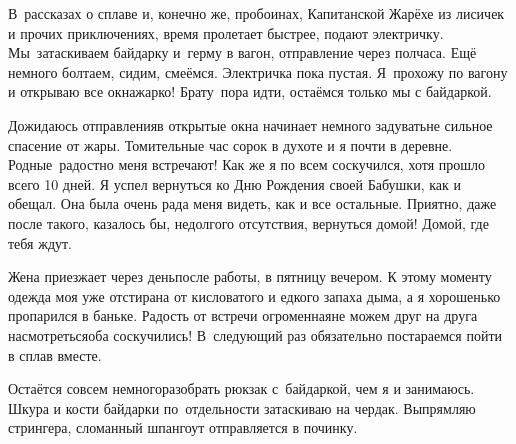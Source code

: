 В~рассказах о сплаве и, конечно же, пробоинах, Капитанской Жарёхе из лисичек и прочих приключениях, время пролетает быстрее, подают электричку. Мы~затаскиваем байдарку и~герму в вагон, отправление через полчаса. Ещё немного болтаем, сидим, смеёмся. Электричка пока пустая. Я~прохожу по вагону и открываю все окна\mdash жарко! Брату~пора идти, остаёмся только мы с байдаркой. 

Дожидаюсь отправления\mdash в открытые окна начинает немного задувать\mdash не сильное спасение от жары. Томительные час сорок в духоте и я почти в деревне. Родные~радостно меня встречают! Как же я по всем соскучился, хотя прошло всего 10 дней. Я успел вернуться ко Дню Рождения своей Бабушки, как и обещал. Она была очень рада меня видеть, как и все остальные. Приятно, даже после такого, казалось бы, недолгого отсутствия, вернуться домой! Домой, где тебя ждут. 

Жена приезжает через день\mdash после работы, в пятницу вечером. К этому моменту одежда моя уже отстирана от кисловатого и едкого запаха дыма, а я хорошенько пропарился в баньке. Радость от встречи огроменная\mdash не можем друг на друга насмотреться\mdash оба соскучились! В~следующий раз обязательно постараемся пойти в сплав вместе. 

Остаётся совсем немного\mdash разобрать рюкзак с~байдаркой, чем я и занимаюсь. Шкура и кости байдарки по~отдельности затаскиваю на чердак. Выпрямляю стрингера, сломанный шпангоут отправляется в починку. 

\begin{center}
\end{center}